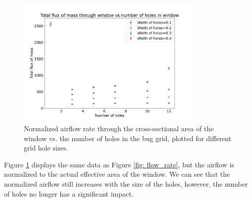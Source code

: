 \begin{figure}[H]
    \centering
    \includegraphics[width=0.8\textwidth]{figures/flux_vs_holes_norm.pdf}
    \caption{Normalized airflow rate through the cross-sectional area of the window vs. the number of holes in the bug grid, plotted for different grid hole sizes.}
    \label{fig: flow_rate_norm}
\end{figure}
Figure \ref{fig: flow_rate_norm} displays the same data as Figure \ref{fig: flow_rate}, but the airflow is normalized to the actual effective area of the window. We can see that the normalized airflow still increases with the size of the holes, however, the number of holes no longer has a significant impact.


